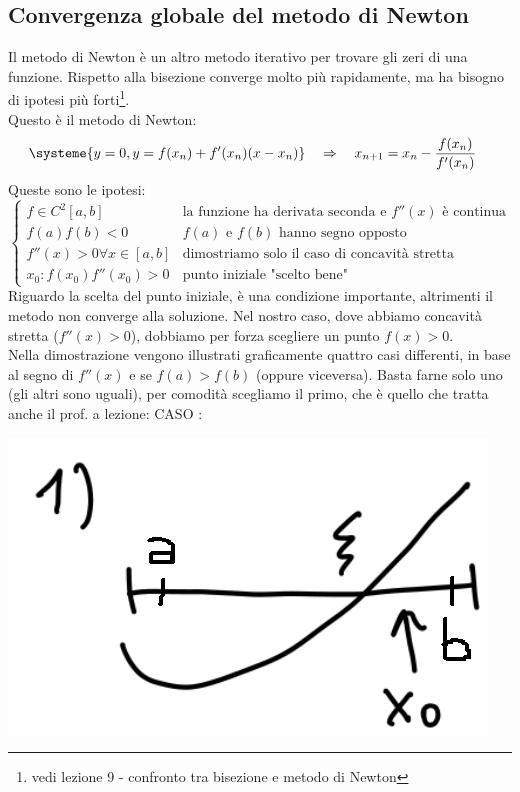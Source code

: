 \subsection{Convergenza globale del metodo di Newton}
Il metodo di Newton è un altro metodo iterativo per trovare gli zeri di una funzione. Rispetto alla bisezione converge molto più rapidamente, ma ha bisogno di ipotesi più forti\footnote[1]{vedi lezione 9 - confronto tra bisezione e metodo di Newton}.\\
Questo è il metodo di Newton:
\begin{align*}
    &\systeme{y = 0, y = f(x_n)+f'(x_n)(x-x_n)}  \quad \Rightarrow \quad x_{n+1} = x_n-\frac{f(x_n)}{f'(x_n)}
\end{align*}
Queste sono le ipotesi:
\begin{equation*}
    \begin{cases}
        f \in C^2[a,b] & \text{la funzione ha derivata seconda e } f''(x) \text{ è continua} \\
        f(a)f(b) < 0   & f(a) \text{ e } f(b) \text{ hanno segno opposto}\\
        f''(x)>0 \forall x \in [a,b] & \text {dimostriamo solo il caso di concavità stretta}\\
        x_0: f(x_0)f''(x_0)>0 & \text{punto iniziale "scelto bene"}
    \end{cases}
    \end{equation*}
Riguardo la scelta del punto iniziale, è una condizione importante, altrimenti il metodo non converge alla soluzione. Nel nostro caso, dove abbiamo concavità stretta ($f''(x)>0$), dobbiamo per forza scegliere un punto $f(x)>0$.\\
Nella dimostrazione vengono illustrati graficamente quattro casi differenti, in base al segno di $f''(x)$ e se $f(a)>f(b)$ (oppure viceversa). Basta farne solo uno (gli altri sono uguali), per comodità scegliamo il primo, che è quello che tratta anche il prof. a lezione:\newline
CASO :
\begin{center}
    \includegraphics[scale=0.5]{./res/img/newton1.png}
\end{center}
